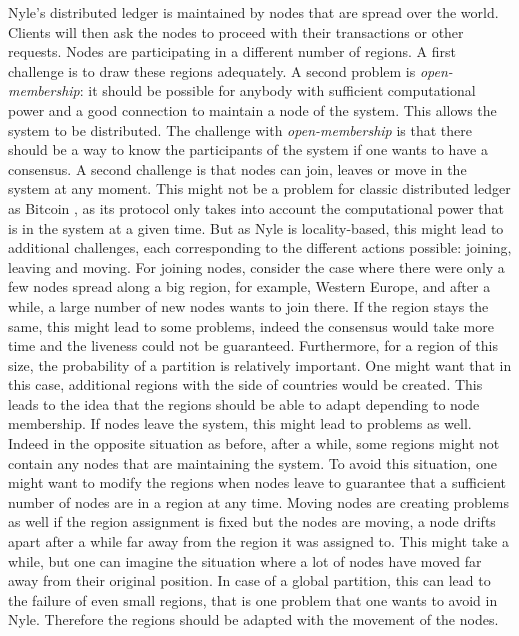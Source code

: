 \documentclass[a4paper,11pt,oneside]{report}
\begin{document}
Nyle's distributed ledger is maintained by nodes that are spread over the world.
Clients will then ask the nodes to proceed with their transactions or other
requests. Nodes are participating in a different number of regions. A first
challenge is to draw these regions adequately. A second problem
is \textit{open-membership}: it should be possible for anybody with sufficient computational power and a good connection to maintain a node of the
system. This allows the system to be distributed. The challenge with
\textit{open-membership} is that there should be a way to know the participants
of the system if one wants to have a consensus.  A second challenge is that
nodes can join, leaves or move in the system at any moment. This might not be a
problem for classic distributed ledger as Bitcoin \cite{Nakamoto2009}, as its
protocol only takes into account the computational power that is in the system at
a given time. But as Nyle is locality-based, this might lead to additional
challenges, each corresponding to the different actions possible: joining,
leaving and moving. For joining nodes, consider the case where there were only a
few nodes spread along a big region, for example, Western Europe, and after a
while, a large number of new nodes wants to join there. If the region
stays the same, this might lead to some problems, indeed the consensus would
take more time and the liveness could not be guaranteed. Furthermore, for a
region of this size, the probability of a partition is relatively important.
One might want that in this case, additional regions with the side of countries would be created. This leads to the idea that the regions should be
able to adapt depending to node membership. If nodes leave the system, this
might lead to problems as well. Indeed in the opposite situation as before,
after a while, some regions might not contain any nodes that are maintaining the
system. To avoid this situation, one might want to modify the regions when nodes
leave to guarantee that a sufficient number of nodes are in a region at any
time. Moving nodes are creating problems as well if the region assignment is
fixed but the nodes are moving, a node drifts apart after a while far away from
the region it was assigned to. This might take a while, but one can imagine the
situation where a lot of nodes have moved far away from their original
position. In case of a global partition, this can lead to the failure of even
small regions, that is one problem that one wants to avoid in Nyle. Therefore
the regions should be adapted with the movement of the nodes. 
\end{document}
